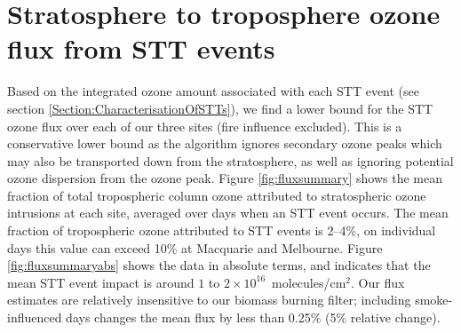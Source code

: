 \documentclass{article}
\begin{document}
\section{Stratosphere to troposphere ozone flux from STT events}
  
  Based on the integrated ozone amount associated with each STT event (see section \ref{Section:CharacterisationOfSTTs}), we find a lower bound for the STT ozone flux over each of our three sites (fire influence excluded).
  This is a conservative lower bound as the algorithm ignores secondary ozone peaks which may also be transported down from the stratosphere, as well as ignoring potential ozone dispersion from the ozone peak.
  Figure \ref{fig:fluxsummary} shows the mean fraction of total tropospheric column ozone attributed to stratospheric ozone intrusions at each site, averaged over days when an STT event occurs.
  The mean fraction of tropospheric ozone attributed to STT events is 2--4\%, on individual days this value can exceed 10\% at Macquarie and Melbourne.
  Figure \ref{fig:fluxsummaryabs} shows the data in absolute terms, and indicates that the mean STT event impact is around $1$ to $2 \times 10^{16}$~molecules/cm$^2$.
  Our flux estimates are relatively insensitive to our biomass burning filter; including smoke-influenced days changes the mean flux by less than 0.25\% (5\% relative change).
  
\end{document}
